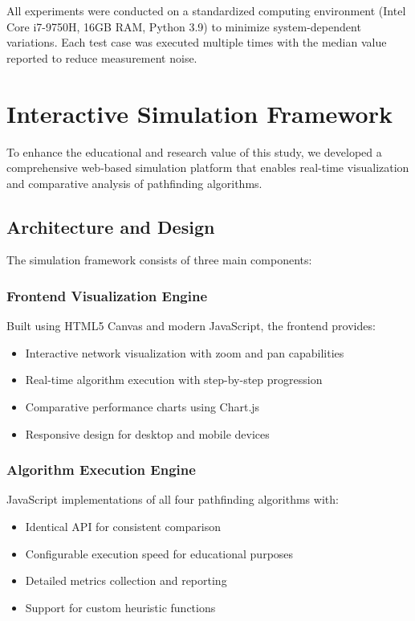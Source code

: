 \documentclass[conference]{IEEEtran}
\begin{document}
All experiments were conducted on a standardized computing environment (Intel Core i7-9750H, 16GB RAM, Python 3.9) to minimize system-dependent variations. Each test case was executed multiple times with the median value reported to reduce measurement noise.

\section{Interactive Simulation Framework}

To enhance the educational and research value of this study, we developed a comprehensive web-based simulation platform that enables real-time visualization and comparative analysis of pathfinding algorithms.

\subsection{Architecture and Design}

The simulation framework consists of three main components:

\subsubsection{Frontend Visualization Engine}
Built using HTML5 Canvas and modern JavaScript, the frontend provides:
\begin{itemize}
\item Interactive network visualization with zoom and pan capabilities
\item Real-time algorithm execution with step-by-step progression
\item Comparative performance charts using Chart.js
\item Responsive design for desktop and mobile devices
\end{itemize}

\subsubsection{Algorithm Execution Engine}
JavaScript implementations of all four pathfinding algorithms with:
\begin{itemize}
\item Identical API for consistent comparison
\item Configurable execution speed for educational purposes
\item Detailed metrics collection and reporting
\item Support for custom heuristic functions
\end{itemize}
\end{document}
